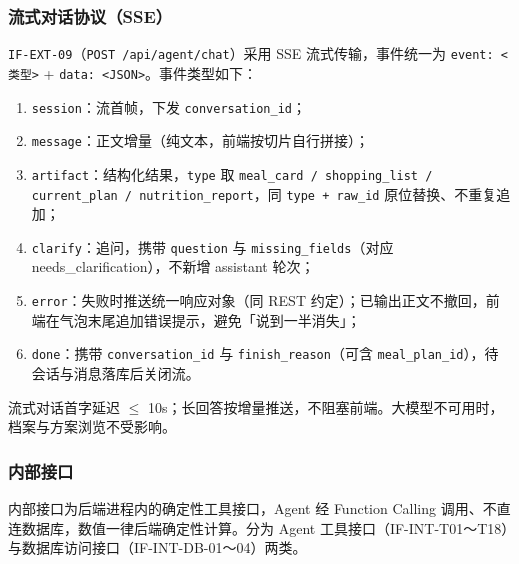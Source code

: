 \documentclass[12pt,a4paper]{ctexart}
\begin{document}
\subsubsection{流式对话协议（SSE）}

\texttt{IF-EXT-09}（\texttt{POST /api/agent/chat}）采用 SSE 流式传输，事件统一为 \texttt{event: <类型>} + \texttt{data: <JSON>}。事件类型如下：

\begin{enumerate}
  \item \texttt{session}：流首帧，下发 \texttt{conversation\_id}；
  \item \texttt{message}：正文增量（纯文本，前端按切片自行拼接）；
  \item \texttt{artifact}：结构化结果，\texttt{type} 取 \texttt{meal\_card / shopping\_list / current\_plan / nutrition\_report}，同 \texttt{type + raw\_id} 原位替换、不重复追加；
  \item \texttt{clarify}：追问，携带 \texttt{question} 与 \texttt{missing\_fields}（对应 needs\_clarification），不新增 assistant 轮次；
  \item \texttt{error}：失败时推送统一响应对象（同 REST 约定）；已输出正文不撤回，前端在气泡末尾追加错误提示，避免「说到一半消失」；
  \item \texttt{done}：携带 \texttt{conversation\_id} 与 \texttt{finish\_reason}（可含 \texttt{meal\_plan\_id}），待会话与消息落库后关闭流。
\end{enumerate}

流式对话首字延迟 $\le$ 10s；长回答按增量推送，不阻塞前端。大模型不可用时，档案与方案浏览不受影响。

\subsubsection{内部接口}

内部接口为后端进程内的确定性工具接口，Agent 经 Function Calling 调用、不直连数据库，数值一律后端确定性计算。分为 Agent 工具接口（IF-INT-T01～T18）与数据库访问接口（IF-INT-DB-01～04）两类。
\end{document}
